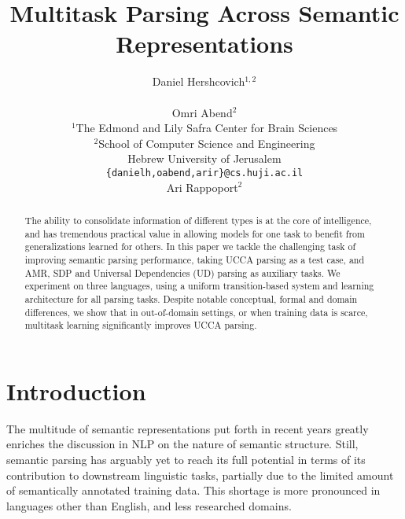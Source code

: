 \documentclass[11pt,a4paper]{article}
\title{Multitask Parsing Across Semantic Representations}
\author{Daniel Hershcovich$^{1,2}$ \\
  \\\And
  Omri Abend$^2$ \\
  $^1$The Edmond and Lily Safra Center for Brain Sciences \\
  $^2$School of Computer Science and Engineering \\
  Hebrew University of Jerusalem \\
  \texttt{\{danielh,oabend,arir\}@cs.huji.ac.il}
  \\\And
  Ari Rappoport$^2$
}
\date{}
\begin{document}
\maketitle

\begin{abstract}
  The ability to consolidate information of different types
  is at the core of intelligence, and has tremendous practical value
  in allowing models for one task to benefit from generalizations learned for others.
  In this paper we
  tackle the challenging task of improving semantic parsing
  performance, taking UCCA
  parsing as a test case, 
  and AMR, SDP and Universal Dependencies (UD) parsing as auxiliary tasks.
  We experiment on three languages,
  using a uniform transition-based system and learning 
  architecture for all parsing tasks.
  Despite notable conceptual, formal and domain differences,
  we show that in out-of-domain settings, or when training data is scarce,
  multitask learning significantly improves UCCA parsing.
\end{abstract}

\section{Introduction}\label{sec:introduction}

The multitude of semantic representations put forth in recent years greatly enriches
the discussion in NLP on the nature of semantic structure.
Still, semantic parsing has arguably yet to reach its full 
potential in terms of its contribution to downstream linguistic tasks,
partially due to the limited amount of semantically annotated training data.
This shortage is more pronounced in 
languages other than English, and less researched domains.

\end{document}
